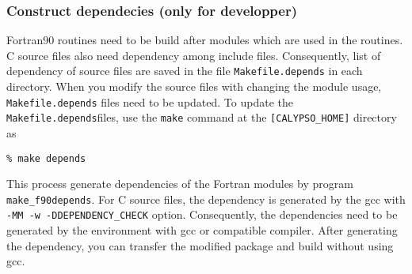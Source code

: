 \subsubsection{Construct dependecies (only for developper)}
Fortran90 routines need to be build after modules which are used in the routines. C source files also need dependency among include files. Consequently, list of dependency of source files are saved in the file \verb|Makefile.depends| in each directory. When you modify the source files with changing the module usage,  \verb|Makefile.depends| files need to be updated. To update the  \verb|Makefile.depends|files, use the  \verb|make| command at the \verb|[CALYPSO_HOME]| directory as \\
%
\begin{verbatim}
% make depends
\end{verbatim}

This process generate dependencies of the Fortran modules by program \verb|make_f90depends|. For C source files, the dependency is generated by the gcc with \verb|-MM -w -DDEPENDENCY_CHECK| option. Consequently, the dependencies need to be generated by the environment with gcc or compatible compiler. After generating the dependency, you can transfer the modified package and build without using gcc.

